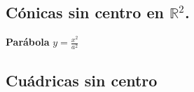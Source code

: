 \documentclass[11pt, a4paper, titlepage]{article}
\theoremstyle{theorem-style}
\theoremstyle{definition-style}
\theoremstyle{remark-style}
\theoremstyle{example-style}
\begin{document}
\subsection{\bf C\'onicas sin centro en $\mathbb{R}^2$.}



{\bf Par\'abola} \hspace{5.5cm}  $y = \frac{x^2}{a^2}$



\subsection{Cuádricas sin centro}
\end{document}
